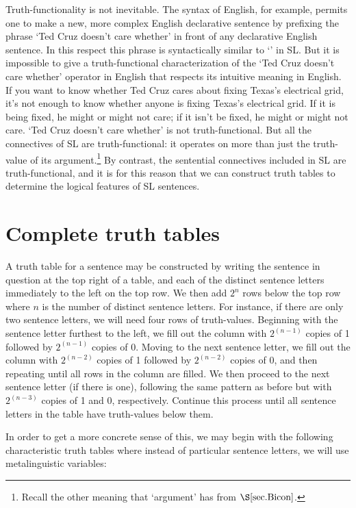 Truth-functionality is not inevitable.
The syntax of English, for example, permits one to make a new, more complex English declarative sentence by prefixing the phrase `Ted Cruz doesn't care whether' in front of any declarative English sentence.
In this respect this phrase is syntactically similar to `\enot' in SL.
But it is impossible to give a truth-functional characterization of the `Ted Cruz doesn't care whether' operator in English that respects its intuitive meaning in English.
If you want to know whether Ted Cruz cares about fixing Texas's electrical grid, it's not enough to know whether anyone is fixing Texas's electrical grid.
If it is being fixed, he might or might not care; if it isn't be fixed, he might or might not care. 
`Ted Cruz doesn't care whether' is not truth-functional.
But all the connectives of SL are truth-functional: it operates on more than just the truth-value of its argument.\footnote{Recall the other meaning that `argument' has from $\S\ref{sec.Bicon}$.}
By contrast, the sentential connectives included in SL are truth-functional, and it is for this reason that we can construct truth tables to determine the logical features of SL sentences.



\section{Complete truth tables}

A truth table for a sentence may be constructed by writing the sentence in question at the top right of a table, and each of the distinct sentence letters immediately to the left on the top row.
We then add $2^n$ rows below the top row where $n$ is the number of distinct sentence letters. 
For instance, if there are only two sentence letters, we will need four rows of truth-values.
Beginning with the sentence letter furthest to the left, we fill out the column with $2^{(n-1)}$ copies of 1 followed by $2^{(n-1)}$ copies of 0.
Moving to the next sentence letter, we fill out the column with $2^{(n-2)}$ copies of 1 followed by $2^{(n-2)}$ copies of 0, and then repeating until all rows in the column are filled.
We then proceed to the next sentence letter (if there is one), following the same pattern as before but with $2^{(n-3)}$ copies of 1 and 0, respectively.
Continue this process until all sentence letters in the table have truth-values below them.

In order to get a more concrete sense of this, we may begin with the following characteristic truth tables where instead of particular sentence letters, we will use metalinguistic variables:

